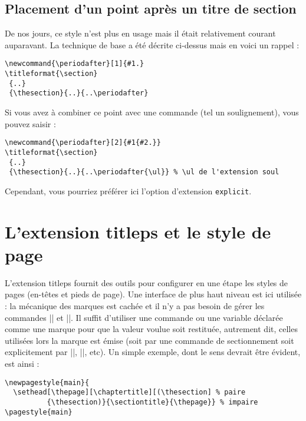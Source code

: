\documentclass[a4paper]{ltxguide}
\begin{document}
\subsection{Placement d'un point après un titre de section} \label{sec:dotafter}

De nos jours, ce style n'est plus en usage mais il était relativement courant
auparavant. 
La technique de base a été décrite ci-dessus mais en voici un rappel :
\begin{verbatim}
\newcommand{\periodafter}[1]{#1.}
\titleformat{\section}
 {..}
 {\thesection}{..}{..\periodafter}
\end{verbatim}

Si vous avez à combiner ce point avec une commande (tel un soulignement), vous pouvez
saisir :
\begin{verbatim}
\newcommand{\periodafter}[2]{#1{#2.}}
\titleformat{\section}
 {..}
 {\thesection}{..}{..\periodafter{\ul}} % \ul de l'extension soul
\end{verbatim}

Cependant, vous pourriez préférer ici l'option d'extension \texttt{explicit}.

\section{L'extension \textsf{titleps} et le style de page}

L'extension \textsf{titleps} fournit des outils pour configurer en une 
étape les styles de pages (en-têtes et pieds de page). Une interface de plus haut
niveau est ici utilisée : la mécanique des marques est cachée et il n'y a
pas besoin de gérer les commandes |\leftmark| et |\rightmark|. Il suffit d'utiliser
une commande ou une variable déclarée comme une \og marque \fg{} pour que la valeur
voulue soit restituée, autrement dit, celles utilisées lors la marque est émise (soit 
par une commande de sectionnement soit explicitement par |\chaptermark|, 
|\sectionmark|, etc). Un simple exemple, dont le sens devrait être évident, est ainsi :
\begin{verbatim}
\newpagestyle{main}{
  \sethead[\thepage][\chaptertitle][(\thesection] % paire
          {\thesection)}{\sectiontitle}{\thepage}} % impaire
\pagestyle{main}
\end{verbatim}
\end{document}
